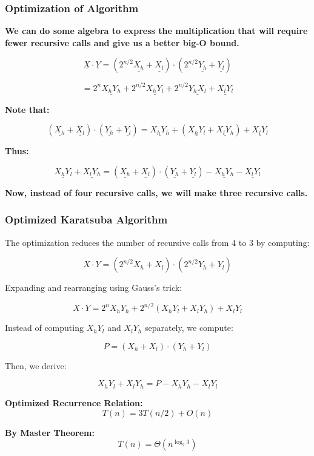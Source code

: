 \begin{frame}
    \frametitle{Optimization of Algorithm}

    \textbf{We can do some algebra to express the multiplication that will require fewer recursive calls and give us a better big-O bound.}

    \vspace{0.5cm}

    \[
    \underline{X} \cdot \underline{Y} = ( 2^{n/2} \underline{X_h} + \underline{X_l} ) \cdot ( 2^{n/2} \underline{Y_h} + \underline{Y_l} )
    \]

    \[
    = 2^n \underline{X_h Y_h} + 2^{n/2} \underline{X_h Y_l} + 2^{n/2} \underline{Y_h X_l} + \underline{X_l Y_l}
    \]

    \vspace{0.5cm}

    \textbf{Note that:}

    \[
    ( \underline{X_h} + \underline{X_l} ) \cdot ( \underline{Y_h} + \underline{Y_l} ) = \underline{X_h Y_h} + ( \underline{X_h Y_l} + \underline{X_l Y_h} ) + \underline{X_l Y_l}
    \]

    \vspace{0.3cm}

    \textbf{Thus:}

    \[
    \underline{X_h Y_l} + \underline{X_l Y_h} = ( \underline{X_h} + \underline{X_l} ) \cdot ( \underline{Y_h} + \underline{Y_l} ) - \underline{X_h Y_h} - \underline{X_l Y_l}
    \]

    \vspace{0.5cm}

    \textbf{Now, instead of four recursive calls, we will make three recursive calls.}

\end{frame}

\begin{frame}
    \frametitle{Optimized Karatsuba Algorithm}

    The optimization reduces the number of recursive calls from 4 to 3 by computing:

    \[
    X \cdot Y = (2^{n/2} X_h + X_l) \cdot (2^{n/2} Y_h + Y_l)
    \]

    Expanding and rearranging using Gauss's trick:

    \[
    X \cdot Y = 2^n X_h Y_h + 2^{n/2} (X_h Y_l + X_l Y_h) + X_l Y_l
    \]

    Instead of computing \( X_h Y_l \) and \( X_l Y_h \) separately, we compute:

    \[
    P = (X_h + X_l) \cdot (Y_h + Y_l)
    \]

    Then, we derive:

    \[
    X_h Y_l + X_l Y_h = P - X_h Y_h - X_l Y_l
    \]

    \vspace{0.1cm}
    \textbf{Optimized Recurrence Relation:}
    \[
        T(n) = 3T(n/2) + O(n)
    \]

    \textbf{By Master Theorem:}
    \[
        T(n) = \Theta(n^{\log_2 3})
    \]

\end{frame}


